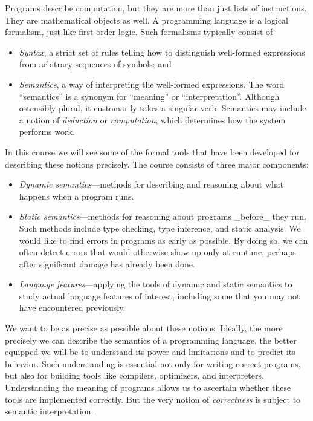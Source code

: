 Programs describe computation, but they are more than just lists of instructions.
They are mathematical objects as well. A programming language is a logical formalism,
just like first-order logic. Such formalisms typically consist of
\begin{itemize}
\item
\emph{Syntax}, a strict set of rules telling how to distinguish well-formed expressions from arbitrary sequences of symbols; and
\item
\emph{Semantics}, a way of interpreting the well-formed expressions. The word ``semantics'' is a synonym for ``meaning'' or ``interpretation''. Although ostensibly plural, it customarily takes a singular verb.
Semantics may include a notion of \emph{deduction} or \emph{computation}, which determines how the system performs work. 
\end{itemize}

In this course we will see some of the formal tools that have been developed
for describing these notions precisely. The course consists of three major components:
\begin{itemize}
\item
\emph{Dynamic semantics}---methods for describing and reasoning about
what happens when a program runs.
\item
\emph{Static semantics}---methods for reasoning about
programs _before_ they run. Such methods include type checking, type
inference, and static analysis. We would like to find errors in
programs as early as possible. By doing so, we can often detect
errors that would otherwise show up only at runtime, perhaps after
significant damage has already been done.
\item
\emph{Language features}---applying the tools of dynamic and static semantics to study
actual language features of interest, including some that you may not have encountered previously.
\end{itemize}
We want to be as precise as possible about these notions.
Ideally, the more precisely we can describe the semantics of a programming language,
the better equipped we will be to understand its power and limitations and 
to predict its behavior. Such understanding is essential not only for
writing correct programs, but also for building tools like compilers,
optimizers, and interpreters. Understanding the meaning of programs
allows us to ascertain whether these tools are implemented correctly.
But the very notion of \emph{correctness} is subject to semantic interpretation.

